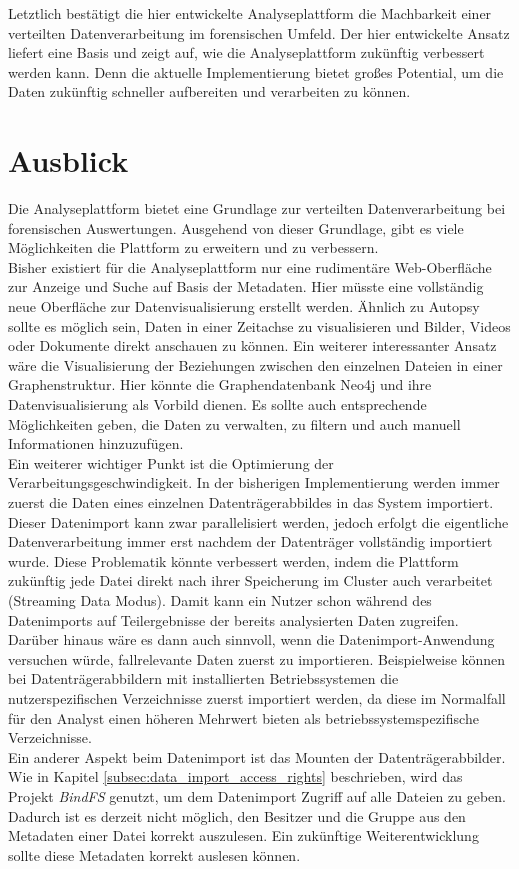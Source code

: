 \noindent
Letztlich bestätigt die hier entwickelte Analyseplattform die Machbarkeit einer verteilten Datenverarbeitung im forensischen Umfeld. Der hier entwickelte Ansatz liefert eine Basis und zeigt auf, wie die Analyseplattform zukünftig verbessert werden kann. Denn die aktuelle Implementierung bietet großes Potential, um die Daten zukünftig schneller aufbereiten und verarbeiten zu können.\\

\chapter{Ausblick}
\label{ch:ausblick}

Die Analyseplattform bietet eine Grundlage zur verteilten Datenverarbeitung bei forensischen Auswertungen. Ausgehend von dieser Grundlage, gibt es viele Möglichkeiten die Plattform zu erweitern und zu verbessern.\\
Bisher existiert für die Analyseplattform nur eine rudimentäre Web-Oberfläche zur Anzeige und Suche auf Basis der Metadaten. Hier müsste eine vollständig neue Oberfläche zur Datenvisualisierung erstellt werden. Ähnlich zu Autopsy sollte es möglich sein, Daten in einer Zeitachse zu visualisieren und Bilder, Videos oder Dokumente direkt anschauen zu können. Ein weiterer interessanter Ansatz wäre die Visualisierung der Beziehungen zwischen den einzelnen Dateien in einer Graphenstruktur. Hier könnte die Graphendatenbank Neo4j und ihre Datenvisualisierung als Vorbild dienen. Es sollte auch entsprechende Möglichkeiten geben, die Daten zu verwalten, zu filtern und auch manuell Informationen hinzuzufügen.\\

\noindent
Ein weiterer wichtiger Punkt ist die Optimierung der Verarbeitungsgeschwindigkeit. In der bisherigen Implementierung werden immer zuerst die Daten eines einzelnen Datenträgerabbildes in das System importiert. Dieser Datenimport kann zwar parallelisiert werden, jedoch erfolgt die eigentliche Datenverarbeitung immer erst nachdem der Datenträger vollständig importiert wurde. Diese Problematik könnte verbessert werden, indem die Plattform zukünftig jede Datei direkt nach ihrer Speicherung im Cluster auch verarbeitet (Streaming Data Modus). Damit kann ein Nutzer schon während des Datenimports auf Teilergebnisse der bereits analysierten Daten zugreifen. Darüber hinaus wäre es dann auch sinnvoll, wenn die Datenimport-Anwendung versuchen würde, fallrelevante Daten zuerst zu importieren.
Beispielweise können bei Datenträgerabbildern mit installierten Betriebssystemen die nutzerspezifischen Verzeichnisse zuerst importiert werden, da diese im Normalfall für den Analyst einen höheren Mehrwert bieten als betriebssystemspezifische Verzeichnisse.\\
Ein anderer Aspekt beim Datenimport ist das Mounten der Datenträgerabbilder. Wie in Kapitel \ref{subsec:data_import_access_rights} beschrieben, wird das Projekt \textit{BindFS} genutzt, um dem Datenimport Zugriff auf alle Dateien zu geben. Dadurch ist es derzeit nicht möglich, den Besitzer und die Gruppe aus den Metadaten einer Datei korrekt auszulesen. Ein zukünftige Weiterentwicklung sollte diese Metadaten korrekt auslesen können.\\

